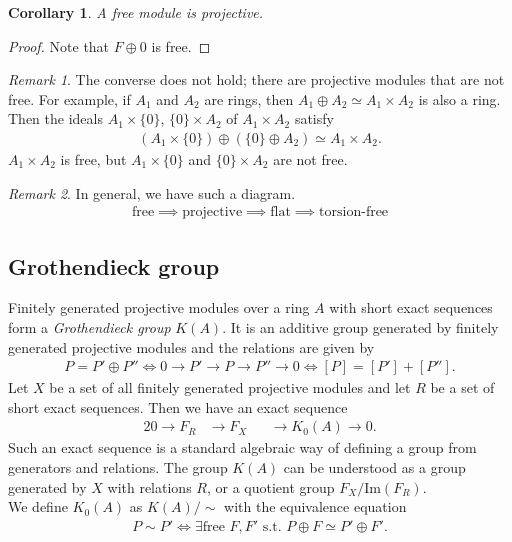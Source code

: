 \documentclass[12pt]{article}
\theoremstyle{plain}
\newtheorem{corollary}[theorem]{Corollary}
\theoremstyle{remark}
\newtheorem*{remark}{Remark}
\theoremstyle{definition}
\begin{document}
\begin{corollary}
    A free module is projective.
\end{corollary}
\begin{proof}
    Note that $F\oplus 0$ is free.
\end{proof}
\begin{remark}
    The converse does not hold; there are projective modules that are not free. For example, if $A_1$ and $A_2$ are rings, then $A_1\oplus A_2\simeq A_1\times A_2$ is also a ring. Then the ideals $A_1\times\{0\}$, $\{0\}\times A_2$ of $A_1\times A_2$ satisfy
    \begin{align*}
        (A_1\times\{0\})\oplus (\{0\}\oplus A_2) \simeq A_1\times A_2.
    \end{align*}
    $A_1\times A_2$ is free, but $A_1\times \{0\}$ and $\{0\}\times A_2$ are not free.
\end{remark}

\begin{remark}
    In general, we have such a diagram.
    \begin{align*}
        \text{free} \implies \text{projective} \implies \text{flat} \implies \text{torsion-free}
    \end{align*}
\end{remark}


\subsection{Grothendieck group}

Finitely generated projective modules over a ring $A$ with short exact sequences form a \emph{Grothendieck group} $K(A)$. It is an additive group generated by finitely generated projective modules and the relations are given by
\begin{align*}
    P=P'\oplus P''\iff 0\rightarrow P'\rightarrow P\rightarrow P'' \rightarrow 0 \iff [P]=[P']+[P''].
\end{align*}
Let $X$ be a set of all finitely generated projective modules and let $R$ be a set of short exact sequences. Then we have an exact sequence
\begin{alignat*}{2}
    0\rightarrow F_R &\rightarrow F_X&& \rightarrow K_0(A)\rightarrow 0. 
\end{alignat*}
Such an exact sequence is a standard algebraic way of defining a group from generators and relations. The group $K(A)$ can be understood as a group generated by $X$ with relations $R$, or a quotient group $F_X/\mathrm{Im}(F_R)$. \\
We define $K_0(A)$ as $K(A)/\sim$ with the equivalence equation
\begin{align*}
    P\sim P' \iff \exists \text{free }F,F'\text{ s.t. }P\oplus F\simeq P'\oplus F'.
\end{align*}
\end{document}
